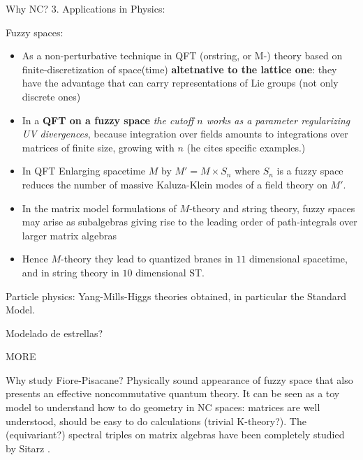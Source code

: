 {    \lin
    
    Why NC? 
    3. Applications in Physics: 
    
    Fuzzy spaces:
            
        \begin{itemize}
            
        \item \cite{FioreTheCase2020}As a non-perturbative technique in QFT (orstring, or M-) theory based on finite-discretization of space(time) \textbf{altetnative to the lattice one}: they have the advantage that can carry representations of Lie groups (not only discrete ones)
        
        \item In a \textbf{QFT on a fuzzy space} \textit{the cutoff $n$ works as a parameter regularizing UV divergences}, because integration over fields amounts to integrations over matrices of finite size, growing with $n$ (he cites specific examples.)
        
        
        \item In QFT Enlarging spacetime $M$ by $M' = M \times S_n$ where $S_n$ is a fuzzy space reduces the number of massive Kaluza-Klein modes of a field theory on $M'$.
        
        \item In the matrix model formulations of $M$-theory and string theory, fuzzy spaces may arise as subalgebras giving rise to the leading order of path-integrals over larger matrix algebras
        
        \item Hence $M$-theory they lead to quantized branes in $11$ dimensional spacetime, and in string theory in $10$ dimensional ST.
            
        \end{itemize}
    
    Particle physics: Yang-Mills-Higgs theories obtained, in particular the Standard Model.
            
    Modelado de estrellas?
            
    MORE
    
    \lin 
    
    Why study Fiore-Pisacane? Physically sound appearance of fuzzy space that also presents an effective noncommutative quantum theory. It can be seen as a toy model to understand how to do geometry in NC spaces: matrices are well understood, should be easy to do calculations (trivial K-theory?). The (equivariant?) spectral triples on matrix algebras have been completely studied by Sitarz \cite{}.
}

